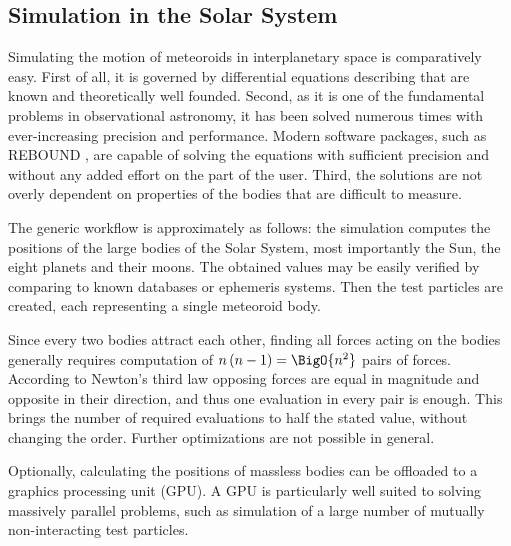     \subsection{Simulation in the Solar System} \label{mio}
        Simulating the motion of meteoroids in interplanetary space is comparatively easy.
        First of all, it is governed by differential equations describing that are known and theoretically well founded.
        Second, as it is one of the fundamental problems in observational astronomy,
        it has been solved numerous times with ever-increasing precision and performance.
        Modern software packages, such as REBOUND \citep{rein+rebound}, are capable of solving the equations
        with sufficient precision and without any added effort on the part of the user.
        Third, the solutions are not overly dependent on properties of the bodies that are difficult to measure.

        The generic workflow is approximately as follows: the simulation computes the positions of
        the large bodies of the Solar System, most importantly the Sun, the eight planets and their moons.
        The obtained values may be easily verified by comparing to known databases or ephemeris systems.
        Then the test particles are created, each representing a single meteoroid body.

        Since every two bodies attract each other, finding all forces acting on the bodies generally
        requires computation of $n\left(n - 1\right) = \BigO{n^2}$ pairs of forces.
        According to Newton's third law opposing forces are equal in magnitude and opposite in their direction,
        and thus one evaluation in every pair is enough.
        This brings the number of required evaluations to half the stated value, without changing the order.
        Further optimizations are not possible in general.

        Optionally, calculating the positions of massless bodies can be offloaded to a graphics processing unit (GPU).
        A GPU is particularly well suited to solving massively parallel problems,
        such as simulation of a large number of mutually non-interacting test particles.


